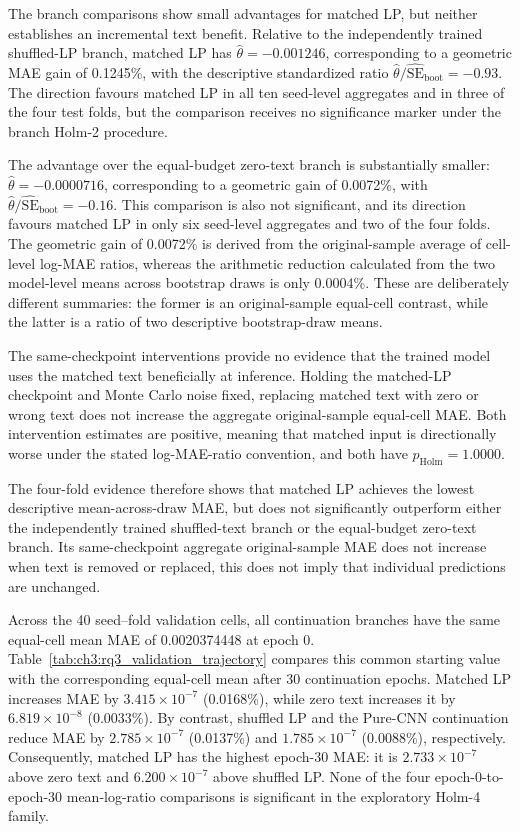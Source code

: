 The branch comparisons show small advantages for matched LP, but neither
establishes an incremental text benefit. Relative to the independently
trained shuffled-LP branch, matched LP has
$\widehat{\theta}=-0.001246$, corresponding to a geometric MAE gain of
0.1245\%, with the descriptive standardized ratio
$\widehat{\theta}/\widehat{\mathrm{SE}}_{\mathrm{boot}}=-0.93$.
The direction favours matched LP in all ten seed-level aggregates and in
three of the four test folds, but the comparison receives no significance
marker under the branch Holm-2 procedure.

The advantage over the equal-budget zero-text branch is substantially
smaller:
$\widehat{\theta}=-0.0000716$, corresponding to a geometric gain of
0.0072\%, with
$\widehat{\theta}/\widehat{\mathrm{SE}}_{\mathrm{boot}}=-0.16$.
This comparison is also not significant, and its direction favours matched
LP in only six seed-level aggregates and two of the four folds. The geometric
gain of 0.0072\% is derived from the original-sample average of cell-level
log-MAE ratios, whereas the arithmetic reduction calculated from the two
model-level means across bootstrap draws is only 0.0004\%. These are
deliberately different summaries: the former is an original-sample
equal-cell contrast, while the latter is a ratio of two descriptive
bootstrap-draw means.


The same-checkpoint interventions provide no evidence that the trained model
uses the matched text beneficially at inference.  Holding the matched-LP
checkpoint and Monte Carlo noise fixed, replacing matched text with zero or
wrong text does not increase the aggregate original-sample equal-cell MAE.
Both intervention estimates are positive,
meaning that matched input is directionally worse under the stated
log-MAE-ratio convention, and both have
$p_{\mathrm{Holm}}=1.0000$.


The four-fold evidence therefore shows that matched LP achieves the lowest
descriptive mean-across-draw MAE, but does not significantly outperform either the
independently trained shuffled-text branch or the equal-budget zero-text
branch. Its same-checkpoint aggregate original-sample MAE does not increase
when text is removed or replaced, this does not imply that individual
predictions are unchanged.  

Across the 40 seed--fold validation cells, all continuation branches have the
same equal-cell mean MAE of 0.0020374448 at epoch 0.
Table~\ref{tab:ch3:rq3_validation_trajectory} compares this common starting
value with the corresponding equal-cell mean after 30 continuation epochs.
Matched LP increases MAE by $3.415\times10^{-7}$ (0.0168\%), while zero text
increases it by $6.819\times10^{-8}$ (0.0033\%).  By contrast, shuffled LP
and the Pure-CNN continuation reduce MAE by $2.785\times10^{-7}$ (0.0137\%)
and $1.785\times10^{-7}$ (0.0088\%), respectively.  Consequently, matched LP
has the highest epoch-30 MAE: it is $2.733\times10^{-7}$ above zero text and
$6.200\times10^{-7}$ above shuffled LP.  None of the four epoch-0-to-epoch-30
mean-log-ratio comparisons is significant in the exploratory Holm-4 family.


